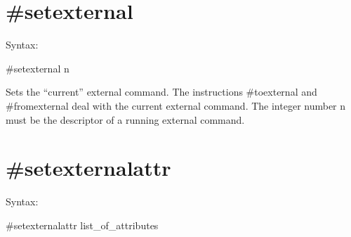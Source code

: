 
\section{\#setexternal}
\label{presetexternal}

\noindent Syntax:

\#setexternal n

\noindent Sets the ``current'' external command. The 
instructions \#toexternal and 
\#fromexternal deal with the current external 
command.  The integer number n must be the descriptor of a running external 
command.


\section{\#setexternalattr}
\label{presetexternalattr}

\noindent Syntax:

\#setexternalattr list\_of\_attributes

